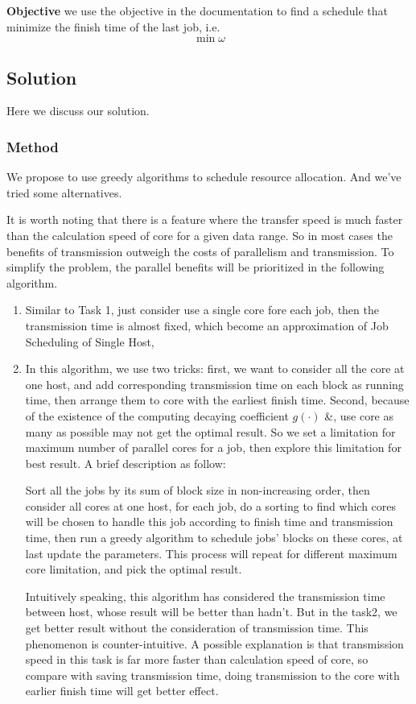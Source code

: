 \documentclass{llncs}
\begin{document}
\textbf{Objective} we use the objective in the documentation to find a schedule that minimize the finish time of the last job, i.e.
\begin{equation}
    \min \omega
\end{equation}


\subsection*{Solution}
Here we discuss our solution.
\subsubsection*{Method}
We propose to use greedy algorithms to schedule resource allocation. And we've tried some alternatives.

It is worth noting that there is a feature where the transfer speed is much faster than the calculation speed of core for a given data range. So in most cases the benefits of transmission outweigh the costs of parallelism and transmission. To simplify the problem, the parallel benefits will be prioritized in the following algorithm.

\begin{enumerate}
    \item 
    Similar to Task 1, just consider use a single core fore each job, then the transmission time is almost fixed, which become an approximation of Job Scheduling of Single Host,
    
    \item
    In this algorithm, we use two tricks: first, we want to consider all the core at one host, and add corresponding transmission time on each block as running time, then arrange them to core with the earliest finish time. Second, because of the existence of the computing decaying coefficient $g(\cdot)$ \&, use core as many as possible may not get the optimal result. So we set a limitation for maximum number of parallel cores for a job, then explore this limitation for best result. A brief description as follow:
    
    Sort all the jobs by its sum of block size in non-increasing order, then consider all cores at one host, for each job, do a sorting to find which cores will be chosen to handle this job according to finish time and transmission time, then run a greedy algorithm to schedule jobs' blocks on these cores, at last update the parameters. This process will repeat for different maximum core limitation, and pick the optimal result.
    
    Intuitively speaking, this algorithm has considered the transmission time between host, whose result will be better than hadn't. But in the task2, we get better result without the consideration of transmission time. This phenomenon is counter-intuitive. A possible explanation is that transmission speed in this task is far more faster than calculation speed of core, so compare with saving transmission time, doing transmission to the core with earlier finish time will get better effect.
    
\end{enumerate}
\end{document}
